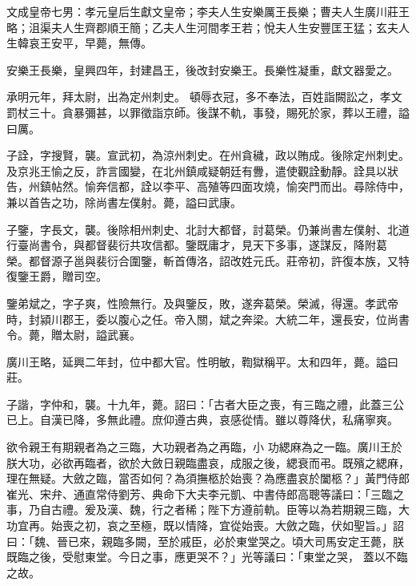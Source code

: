 
\begin{pinyinscope}

 文成皇帝七男：孝元皇后生獻文皇帝；李夫人生安樂厲王長樂；曹夫人生廣川莊王略；沮渠夫人生齊郡順王簡；乙夫人生河間孝王若；悅夫人生安豐匡王猛；玄夫人生韓哀王安平，早薨，無傳。



 安樂王長樂，皇興四年，封建昌王，後改封安樂王。長樂性凝重，獻文器愛之。



 承明元年，拜太尉，出為定州刺史。
 頓辱衣冠，多不奉法，百姓詣闕訟之，孝文罰杖三十。貪暴彌甚，以罪徵詣京師。後謀不軌，事發，賜死於家，葬以王禮，謚曰厲。



 子詮，字搜賢，襲。宣武初，為涼州刺史。在州貪穢，政以賄成。後除定州刺史。及京兆王愉之反，詐言國變，在北州鎮咸疑朝廷有釁，遣使觀詮動靜。詮具以狀告，州鎮帖然。愉奔信都，詮以李平、高殖等四面攻燒，愉突門而出。尋除侍中，兼以首告之功，除尚書左僕射。薨，謚曰武康。



 子鑒，字長文，襲。後除相州刺史、北討大都督，討葛榮。仍兼尚書左僕射、北道行臺尚書令，與都督裴衍共攻信都。鑒既庸才，見天下多事，遂謀反，降附葛
 榮。都督源子邕與裴衍合圍鑒，斬首傳洛，詔改姓元氏。莊帝初，許復本族，又特復鑒王爵，贈司空。



 鑒弟斌之，字子爽，性險無行。及與鑒反，敗，遂奔葛榮。榮滅，得還。孝武帝時，封潁川郡王，委以腹心之任。帝入關，斌之奔梁。大統二年，還長安，位尚書令。薨，贈太尉，謚武襄。



 廣川王略，延興二年封，位中都大官。性明敏，鞫獄稱平。太和四年，薨。謚曰莊。



 子諧，字仲和，襲。十九年，薨。詔曰：「古者大臣之喪，有三臨之禮，此蓋三公已上。自漢已降，多無此禮。庶仰遵古典，哀感從情。雖以尊降伏，私痛寧爽。



 欲令親王有期親者為之三臨，大功親者為之再臨，小
 功緦麻為之一臨。廣川王於朕大功，必欲再臨者，欲於大斂日親臨盡哀，成服之後，緦衰而弔。既殯之緦麻，理在無疑。大斂之臨，當否如何？為須撫柩於始喪？為應盡哀於闔柩？」黃門侍郎崔光、宋弁、通直常侍劉芳、典命下大夫李元凱、中書侍郎高聰等議曰：「三臨之事，乃自古禮。爰及漢、魏，行之者稀；陛下方遵前軌。臣等以為若期親三臨，大功宜再。始喪之初，哀之至極，既以情降，宜從始喪。大斂之臨，伏如聖旨。」詔曰：「魏、晉已來，親臨多闕，至於戚臣，必於東堂哭之。頃大司馬安定王薨，朕既臨之後，受慰東堂。今日之事，應更哭不？」光等議曰：「東堂之哭，
 蓋以不臨之故。




\end{pinyinscope}

